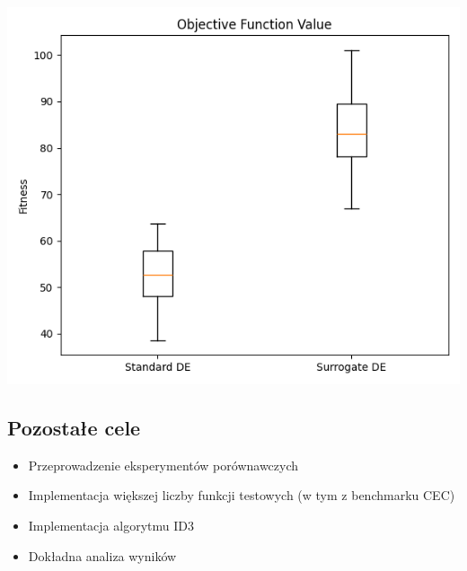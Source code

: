 \documentclass{article}
\begin{document}
\includegraphics[scale=0.7]{results_fitness.png}

\subsection{Pozostałe cele}
\begin{itemize}
   \item Przeprowadzenie eksperymentów porównawczych
   \item Implementacja większej liczby funkcji testowych (w tym z benchmarku CEC)
   \item Implementacja algorytmu ID3
   \item Dokładna analiza wyników
\end{itemize}
\end{document}

